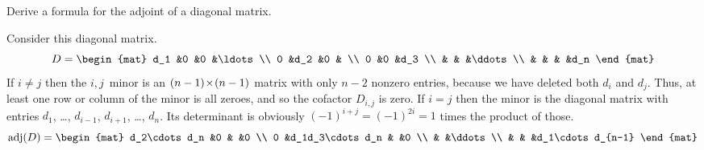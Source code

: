 
\begin{Exercise}[
name={},
title={}, 
difficulty=0,
origin={\cite{JH}}]
Derive a formula for the adjoint of a diagonal matrix.

\end{Exercise}

\begin{Answer}
      Consider this diagonal matrix.
      \begin{equation*}
        D=
        \begin{mat}
          d_1  &0   &0   &\ldots    \\
          0    &d_2 &0   &          \\
          0    &0   &d_3            \\
               &    &    &\ddots    \\
               &    &    &      &d_n   
        \end{mat}
      \end{equation*}
      If $i\neq j$ then the $i,j$~minor is an $(n-1) \! \times \! (n-1)$ matrix
      with only $n-2$ nonzero entries, because we have deleted
      both $d_i$ and $d_j$.
      Thus, at least one row or column of the minor is all zeroes, and
      so the cofactor $D_{i,j}$ is zero.
      If $i=j$ then the minor is the diagonal matrix with entries
      $d_1$, \ldots, $d_{i-1}$, $d_{i+1}$, \ldots, $d_n$.
      Its determinant is obviously $(-1)^{i+j}=(-1)^{2i}=1$ 
      times the product of those.
      \begin{equation*}
        \adj(D)
        =
        \begin{mat}
          d_2\cdots d_n    &0                 &      &0    \\
          0                &d_1d_3\cdots d_n  &      &0    \\
                           &                  &\ddots      \\
                           &                  &       &d_1\cdots d_{n-1} 
        \end{mat}
      \end{equation*}

\end{Answer}
